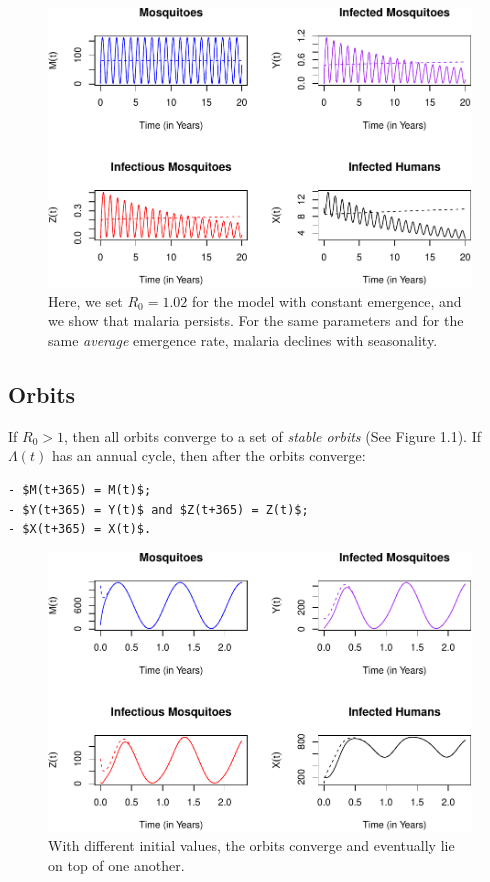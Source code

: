 \documentclass[
]{book}
\begin{document}
\begin{figure}
\centering
\includegraphics{_main_files/figure-latex/unnamed-chunk-19-1.pdf}
\caption{\label{fig:unnamed-chunk-19}Here, we set \(R_0= 1.02\) for the model with constant emergence, and we show that malaria persists. For the same parameters and for the same \emph{average} emergence rate, malaria declines with seasonality.}
\end{figure}

\clearpage

\hypertarget{orbits}{%
\subsection{Orbits}\label{orbits}}

If \(R_0 >1\), then all orbits converge to a set of \emph{stable orbits} (See Figure 1.1). If \(\Lambda(t)\) has an annual cycle, then after the orbits converge:

\begin{verbatim}
- $M(t+365) = M(t)$; 
- $Y(t+365) = Y(t)$ and $Z(t+365) = Z(t)$; 
- $X(t+365) = X(t)$. 
\end{verbatim}

\begin{figure}
\centering
\includegraphics{_main_files/figure-latex/unnamed-chunk-20-1.pdf}
\caption{\label{fig:unnamed-chunk-20}With different initial values, the orbits converge and eventually lie on top of one another.}
\end{figure}
\end{document}
